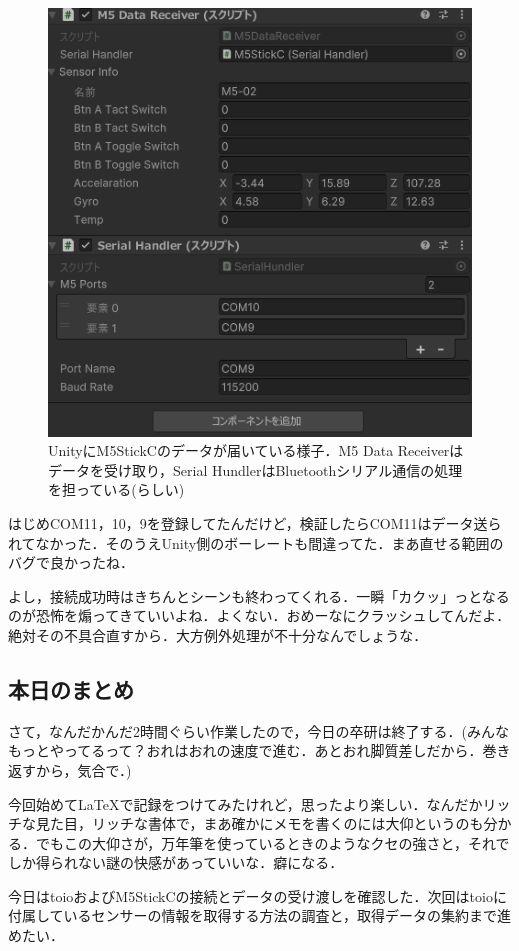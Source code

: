 \documentclass[fleqn,twocolumn]{mynote}
\begin{document}
\begin{figure}[h]
  \label{m5-getting-sensor}
  \centering
  \includegraphics[keepaspectratio, width=0.7\columnwidth]{resources/m5stickc_getting_sensor.png}
  \caption[short]{UnityにM5StickCのデータが届いている様子．M5 Data Receiverはデータを受け取り，Serial HundlerはBluetoothシリアル通信の処理を担っている(らしい)}
\end{figure}

はじめCOM11，10，9を登録してたんだけど，検証したらCOM11はデータ送られてなかった．そのうえUnity側のボーレートも間違ってた．まあ直せる範囲のバグで良かったね．

よし，接続成功時はきちんとシーンも終わってくれる．一瞬「カクッ」っとなるのが恐怖を煽ってきていいよね．よくない．おめーなにクラッシュしてんだよ．絶対その不具合直すから．大方例外処理が不十分なんでしょうな．

\subsection*{本日のまとめ}
さて，なんだかんだ2時間ぐらい作業したので，今日の卒研は終了する．(みんなもっとやってるって？おれはおれの速度で進む．あとおれ脚質差しだから．巻き返すから，気合で．)

今回始めて\LaTeX で記録をつけてみたけれど，思ったより楽しい．なんだかリッチな見た目，リッチな書体で，まあ確かにメモを書くのには大仰というのも分かる．でもこの大仰さが，万年筆を使っているときのようなクセの強さと，それでしか得られない謎の快感があっていいな．癖になる．

今日はtoioおよびM5StickCの接続とデータの受け渡しを確認した．次回はtoioに付属しているセンサーの情報を取得する方法の調査と，取得データの集約まで進めたい．
\end{document}

